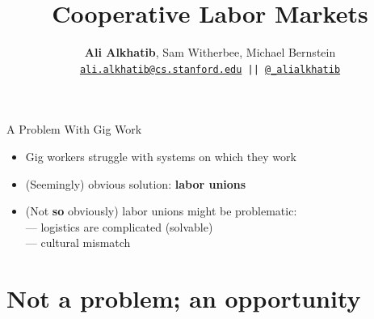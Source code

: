 \documentclass{beamer}
\title{Cooperative Labor Markets}
\author{\textbf{Ali Alkhatib}, Sam Witherbee, Michael Bernstein \\
\texttt{ \href{mailto:ali.alkhatib@cs.stanford.edu}{ali.alkhatib@cs.stanford.edu} ||
         \href{http://twitter.com/_alialkhatib}{@\_alialkhatib} }}
\institute[Stanford]{Stanford University}
\date{\usdate{\formatdate{27}{2}{2016}}}
\begin{document}
\begin{frame}
\titlepage
\end{frame}


\begin{frame}{A Problem With Gig Work}
  \begin{itemize}[<+- | alert@+>]
    \item Gig workers struggle with systems on which they work
      \cite{turkopticon,uberAlgorithm,dynamo}
    \item (Seemingly) obvious solution: \textbf{labor unions}
    \item (Not \textbf{so} obviously) labor unions might be problematic:
      \\ --- logistics are complicated (solvable)
      \\ --- cultural mismatch
        \cite{dynamo}
  \end{itemize}
\end{frame}


\section{Not a problem; an opportunity}
\end{document}
